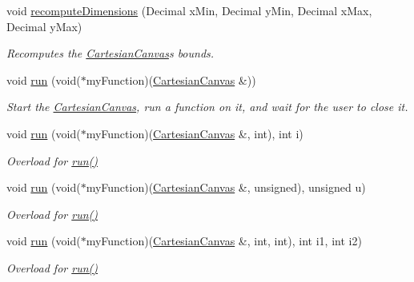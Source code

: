 \begin{DoxyCompactItemize}
void \hyperlink{classtsgl_1_1_cartesian_canvas_ac833a44fe7367f6411292707de37beef}{recompute\+Dimensions} (Decimal x\+Min, Decimal y\+Min, Decimal x\+Max, Decimal y\+Max)
\begin{DoxyCompactList}\small\item\em Recomputes the \hyperlink{classtsgl_1_1_cartesian_canvas}{Cartesian\+Canvas}\textquotesingle{}s bounds. \end{DoxyCompactList}\item 
void \hyperlink{classtsgl_1_1_cartesian_canvas_a63a948af53582b713957b872a765dcdb}{run} (void($\ast$my\+Function)(\hyperlink{classtsgl_1_1_cartesian_canvas}{Cartesian\+Canvas} \&))
\begin{DoxyCompactList}\small\item\em Start the \hyperlink{classtsgl_1_1_cartesian_canvas}{Cartesian\+Canvas}, run a function on it, and wait for the user to close it. \end{DoxyCompactList}\item 
void \hyperlink{classtsgl_1_1_cartesian_canvas_a4d50613e241cab83878aa4438f3db67e}{run} (void($\ast$my\+Function)(\hyperlink{classtsgl_1_1_cartesian_canvas}{Cartesian\+Canvas} \&, int), int i)
\begin{DoxyCompactList}\small\item\em Overload for \hyperlink{classtsgl_1_1_cartesian_canvas_a63a948af53582b713957b872a765dcdb}{run()} \end{DoxyCompactList}\item 
void \hyperlink{classtsgl_1_1_cartesian_canvas_ab18eee19a5a0c7011c4442b64d05f6cc}{run} (void($\ast$my\+Function)(\hyperlink{classtsgl_1_1_cartesian_canvas}{Cartesian\+Canvas} \&, unsigned), unsigned u)
\begin{DoxyCompactList}\small\item\em Overload for \hyperlink{classtsgl_1_1_cartesian_canvas_a63a948af53582b713957b872a765dcdb}{run()} \end{DoxyCompactList}\item 
void \hyperlink{classtsgl_1_1_cartesian_canvas_aae4be78e02055eed3e6e85bb39411f21}{run} (void($\ast$my\+Function)(\hyperlink{classtsgl_1_1_cartesian_canvas}{Cartesian\+Canvas} \&, int, int), int i1, int i2)
\begin{DoxyCompactList}\small\item\em Overload for \hyperlink{classtsgl_1_1_cartesian_canvas_a63a948af53582b713957b872a765dcdb}{run()} \end{DoxyCompactList}\item 

\end{DoxyCompactItemize}
